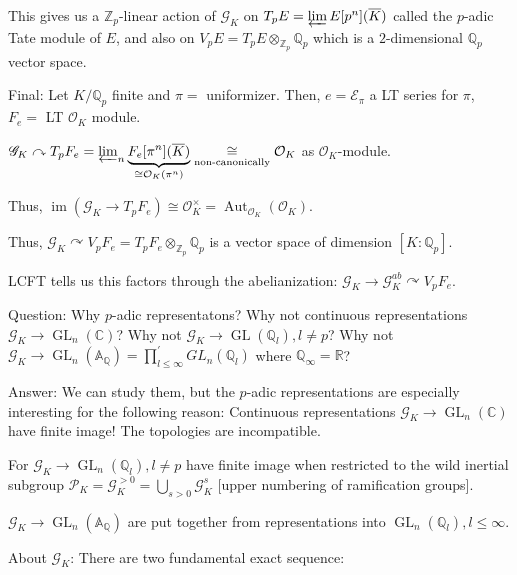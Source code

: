 \documentclass{article}
\theoremstyle{definition}
\numberwithin{theorem}{subsection}
\begin{document}
    This gives us a \(\mathbb{Z}_p\)-linear action of \(\mathscr{G}_K\) on \(T_p E = \varprojlim E[p^n](\overline{K})\) called the \(p\)-adic Tate module of \(E\), and also on \(V_p E = T_p E \otimes_{\mathbb{Z}_p}\mathbb{Q}_p\) which is a \(2\)-dimensional \(\mathbb{Q}_p\) vector space. 

    Final: Let \(K / \mathbb{Q}_p\) finite and \(\pi = \) uniformizer. Then, \(e = \mathscr{E}_\pi\) a LT series for \(\pi\), \(F_e =\) LT \(\mathcal{O}_K\) module.

    \(\mathscr{G}_K \curvearrowright T_p F_e = \varprojlim_n \underbrace{F_e[\pi^n](\overline{K})}_{\cong \mathcal{O}_K(\pi^n)} \underset{\text{non-canonically}}{\cong} \mathcal{O}_K\) as \(\mathcal{O}_K\)-module.

    Thus, \(\operatorname{im} (\mathscr{G}_K \to T_p F_e) \cong \mathcal{O}_K^\times = \operatorname{Aut}_{\mathcal{O}_K}(\mathcal{O}_K)\).
    
    Thus, \(\mathscr{G}_K \curvearrowright V_p F_e = T_p F_e \otimes_{\mathbb{Z}_p} \mathbb{Q}_p\) is a vector space of dimension \([K:\mathbb{Q}_p]\). 

    LCFT tells us this factors through the abelianization: \(\mathscr{G}_K \to \mathscr{G}_K^{ab} \curvearrowright V_p F_e\).

    Question: Why \(p\)-adic representatons? Why not continuous representations \(\mathscr{G}_K \to \operatorname{GL}_n(\mathbb{C})\)? Why not \(\mathscr{G}_K \to \operatorname{GL}(\mathbb{Q}_l), l \neq p\)? Why not \(\mathscr{G}_K \to \operatorname{GL}_n (\mathbb{A}_\mathbb{Q}) = \prod_{l \leq \infty}^{\prime} GL_n(\mathbb{Q}_l)\) where \(\mathbb{Q}_\infty = \mathbb{R}\)?
    
    Answer: We can study them, but the \(p\)-adic representations are especially interesting for the following reason: Continuous representations \(\mathscr{G}_K \to \operatorname{GL}_n(\mathbb{C})\) have finite image! The topologies are incompatible.

    For \(\mathscr{G}_K \to \operatorname{GL}_n(\mathbb{Q}_l),l\neq p\) have finite image when restricted to the wild inertial subgroup \(\mathscr{P}_K = \mathscr{G}_K^{> 0} = \bigcup_{s > 0} \mathscr{G}_K^s\) [upper numbering of ramification groups].

    \(\mathscr{G}_K \to \operatorname{GL}_n(\mathbb{A}_\mathbb{Q})\) are put together from representations into \(\operatorname{GL}_n(\mathbb{Q}_l), l \leq \infty\). 

    About \(\mathscr{G}_K\): There are two fundamental exact sequence:
\end{document}
